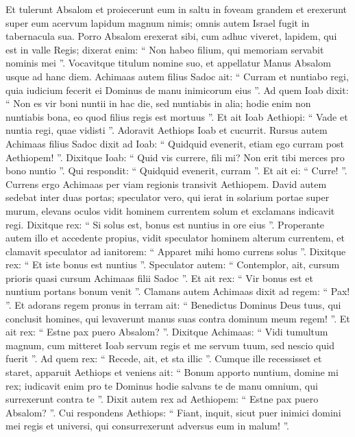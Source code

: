 \begin{biblechapter}
\begin{biblechapter}
\begin{biblechapter}
\begin{biblechapter}
\begin{biblechapter}
\begin{biblechapter}
\begin{biblechapter}
\begin{biblechapter}
\begin{biblechapter}
\begin{biblechapter}
\begin{biblechapter}
\begin{biblechapter}
\begin{biblechapter}
\begin{biblechapter}
\begin{biblechapter}
\begin{biblechapter}
\begin{biblechapter}
\begin{biblechapter}
\verse Et tulerunt Absalom et proiecerunt eum in saltu in foveam grandem et erexerunt super eum acervum lapidum magnum nimis; omnis autem Israel fugit in tabernacula sua.
 \verse Porro Absalom erexerat sibi, cum adhuc viveret, lapidem, qui est in valle Regis; dixerat enim: “ Non habeo filium, qui memoriam servabit nominis mei ”. Vocavitque titulum nomine suo, et appellatur Manus Absalom usque ad hanc diem.
 \verse Achimaas autem filius Sadoc ait: “ Curram et nuntiabo regi, quia iudicium fecerit ei Dominus de manu inimicorum eius ”. 
\verse Ad quem Ioab dixit: “ Non es vir boni nuntii in hac die, sed nuntiabis in alia; hodie enim non nuntiabis bona, eo quod filius regis est mortuus ”. 
\verse Et ait Ioab Aethiopi: “ Vade et nuntia regi, quae vidisti ”. Adoravit Aethiops Ioab et cucurrit. 
\verse Rursus autem Achimaas filius Sadoc dixit ad Ioab: “ Quidquid evenerit, etiam ego curram post Aethiopem! ”. Dixitque Ioab: “ Quid vis currere, fili mi? Non erit tibi merces pro bono nuntio ”. 
\verse Qui respondit: “ Quidquid evenerit, curram ”. Et ait ei: “ Curre! ”. Currens ergo Achimaas per viam regionis transivit Aethiopem.
 \verse David autem sedebat inter duas portas; speculator vero, qui ierat in solarium portae super murum, elevans oculos vidit hominem currentem solum 
\verse et exclamans indicavit regi. Dixitque rex: “ Si solus est, bonus est nuntius in ore eius ”. Properante autem illo et accedente propius, 
\verse vidit speculator hominem alterum currentem, et clamavit speculator ad ianitorem: “ Apparet mihi homo currens solus ”. Dixitque rex: “ Et iste bonus est nuntius ”. 
\verse Speculator autem: “ Contemplor, ait, cursum prioris quasi cursum Achimaas filii Sadoc ”. Et ait rex: “ Vir bonus est et nuntium portans bonum venit ”.
 \verse Clamans autem Achimaas dixit ad regem: “ Pax! ”. Et adorans regem pronus in terram ait: “ Benedictus Dominus Deus tuus, qui conclusit homines, qui levaverunt manus suas contra dominum meum regem! ”. 
\verse Et ait rex: “ Estne pax puero Absalom? ”. Dixitque Achimaas: “ Vidi tumultum magnum, cum mitteret Ioab servum regis et me servum tuum, sed nescio quid fuerit ”. 
\verse Ad quem rex: “ Recede, ait, et sta illic ”. Cumque ille recessisset et staret, 
\verse apparuit Aethiops et veniens ait: “ Bonum apporto nuntium, domine mi rex; iudicavit enim pro te Dominus hodie salvans te de manu omnium, qui surrexerunt contra te ”. 
\verse Dixit autem rex ad Aethiopem: “ Estne pax puero Absalom? ”. Cui respondens Aethiops: “ Fiant, inquit, sicut puer inimici domini mei regis et universi, qui consurrexerunt adversus eum in malum! ”.
 

\end{biblechapter}
\end{biblechapter}
\end{biblechapter}
\end{biblechapter}
\end{biblechapter}
\end{biblechapter}
\end{biblechapter}
\end{biblechapter}
\end{biblechapter}
\end{biblechapter}
\end{biblechapter}
\end{biblechapter}
\end{biblechapter}
\end{biblechapter}
\end{biblechapter}
\end{biblechapter}
\end{biblechapter}
\end{biblechapter}
